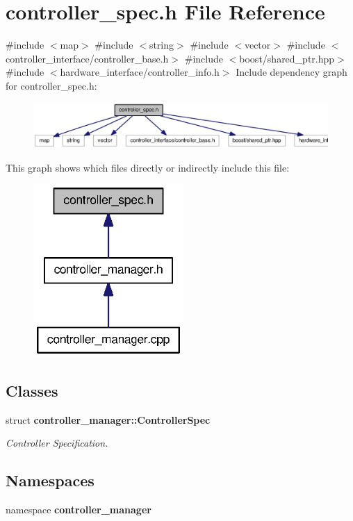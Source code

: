 \section{controller\-\_\-spec.\-h \-File \-Reference}
\label{controller__spec_8h}
{\ttfamily \#include $<$map$>$}\*
{\ttfamily \#include $<$string$>$}\*
{\ttfamily \#include $<$vector$>$}\*
{\ttfamily \#include $<$controller\-\_\-interface/controller\-\_\-base.\-h$>$}\*
{\ttfamily \#include $<$boost/shared\-\_\-ptr.\-hpp$>$}\*
{\ttfamily \#include $<$hardware\-\_\-interface/controller\-\_\-info.\-h$>$}\*
\-Include dependency graph for controller\-\_\-spec.\-h\-:\nopagebreak
\begin{figure}[H]
\begin{center}
\leavevmode
\includegraphics[width=350pt]{controller__spec_8h__incl}
\end{center}
\end{figure}
\-This graph shows which files directly or indirectly include this file\-:\nopagebreak
\begin{figure}[H]
\begin{center}
\leavevmode
\includegraphics[width=162pt]{controller__spec_8h__dep__incl}
\end{center}
\end{figure}
\subsection*{\-Classes}
\begin{DoxyCompactItemize}
\item 
struct {\bf controller\-\_\-manager\-::\-Controller\-Spec}
\begin{DoxyCompactList}\small\item\em \-Controller \-Specification. \end{DoxyCompactList}\end{DoxyCompactItemize}
\subsection*{\-Namespaces}
\begin{DoxyCompactItemize}
\item 
namespace {\bf controller\-\_\-manager}
\end{DoxyCompactItemize}
